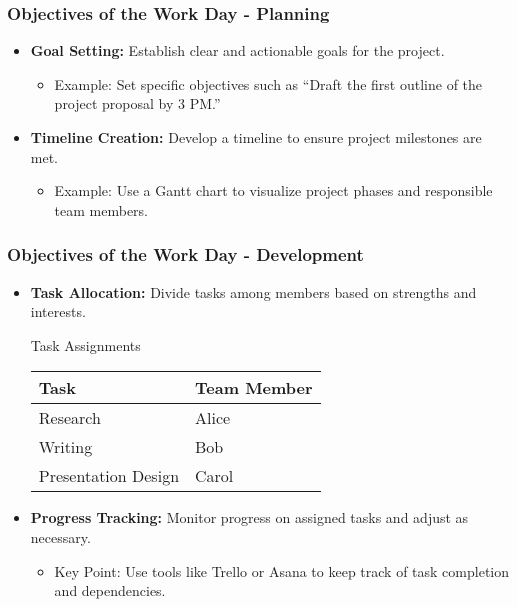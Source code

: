 \documentclass{beamer}
\begin{document}
\begin{frame}[fragile]
    \frametitle{Objectives of the Work Day - Planning}
    \begin{itemize}
        \item \textbf{Goal Setting:} Establish clear and actionable goals for the project.
        \begin{itemize}
            \item Example: Set specific objectives such as ``Draft the first outline of the project proposal by 3 PM.''
        \end{itemize}

        \item \textbf{Timeline Creation:} Develop a timeline to ensure project milestones are met.
        \begin{itemize}
            \item Example: Use a Gantt chart to visualize project phases and responsible team members.
        \end{itemize}
    \end{itemize}
\end{frame}

\begin{frame}[fragile]
    \frametitle{Objectives of the Work Day - Development}
    \begin{itemize}
        \item \textbf{Task Allocation:} Divide tasks among members based on strengths and interests.
        \begin{block}{Task Assignments}
            \begin{center}
            \begin{tabular}{|l|l|}
                \hline
                \textbf{Task} & \textbf{Team Member} \\
                \hline
                Research & Alice \\
                Writing & Bob \\
                Presentation Design & Carol \\
                \hline
            \end{tabular}
            \end{center}
            \end{block}

        \item \textbf{Progress Tracking:} Monitor progress on assigned tasks and adjust as necessary.
        \begin{itemize}
            \item Key Point: Use tools like Trello or Asana to keep track of task completion and dependencies.
        \end{itemize}
    \end{itemize}
\end{frame}
\end{document}
